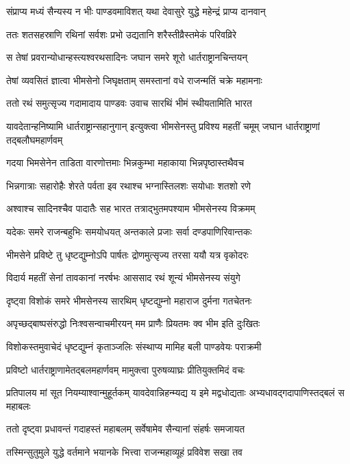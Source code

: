 \threelineshloka
{संप्राप्य मध्यं सैन्यस्य न भीः पाण्डवमाविशत्}
{यथा देवासुरे युद्धे महेन्द्रं प्राप्य दानवान्}
{}


\twolineshloka
{ततः शतसहस्राणि रथिनां सर्वशः प्रभो}
{उद्यतानि शरैस्तीव्रैस्तमेकं परिवव्रिरे}


\twolineshloka
{स तेषां प्रवरान्योधान्हस्त्यश्वरथसादिनः}
{जघान समरे शूरो धार्तराष्ट्रानचिन्तयन्}


\twolineshloka
{तेषां व्यवसितं ज्ञात्वा भीमसेनो जिघृक्षताम्}
{समस्तानां वधे राजन्मतिं चक्रे महामनाः}


\twolineshloka
{ततो रथं समुत्सृज्य गदामादाय पाण्डवः}
{उवाच सारथिं भीमं स्थीयतामिति भारत}


\threelineshloka
{यावदेतान्हनिष्यामि धार्तराष्ट्रान्सहानुगान्}
{इत्युक्त्वा भीमसेनस्तु प्रविश्य महतीं चमूम्}
{जघान धार्तराष्ट्राणां तद्बलौघमहार्णवम्}


\twolineshloka
{गदया भिमसेनेन ताडिता वारणोत्तमाः}
{भिन्नकुम्भा महाकाया भिन्नपृष्ठास्तथैवच}


\twolineshloka
{भिन्नगात्राः सहारोहैः शेरते पर्वता इव}
{रथाश्च भग्नास्तिलशः सयोधाः शतशो रणे}


\twolineshloka
{अश्वाश्च सादिनश्चैव पादातैः सह भारत}
{तत्राद्भुतमपश्याम भीमसेनस्य विक्रमम्}


\twolineshloka
{यदेकः समरे राजन्बहुभिः समयोधयत्}
{अन्तकाले प्रजाः सर्वा दण्डपाणिरिवान्तकः}


\twolineshloka
{भीमसेने प्रविष्टे तु धृष्टद्युम्नोऽपि पार्षतः}
{द्रोणमुत्सृज्य तरसा ययौ यत्र वृकोदरः}


\twolineshloka
{विदार्य महतीं सेनां तावकानां नरर्षभः}
{आससाद रथं शून्यं भीमसेनस्य संयुगे}


\twolineshloka
{दृष्ट्वा विशोकं समरे भीमसेनस्य सारथिम्}
{धृष्टद्युम्नो महाराज दुर्मना गतचेतनः}


\twolineshloka
{अपृच्छद्बाष्पसंरुद्धो निःश्वसन्वाचमीरयन्}
{मम प्राणैः प्रियतमः क्व भीम इति दुःखितः}


\twolineshloka
{विशोकस्तमुवाचेदं धृष्टद्युम्नं कृताञ्जलिः}
{संस्थाप्य मामिह बली पाण्डवेयः पराक्रमी}


\twolineshloka
{प्रविष्टो धार्तराष्ट्राणामेतद्बलमहार्णवम्}
{मामुक्त्वा पुरुषव्याघ्रः प्रीतियुक्तमिदं वचः}


\threelineshloka
{प्रतिपालय मां सूत नियम्याश्वान्मुहूर्तकम्}
{यावदेवान्निहन्म्यद्य य इमे मद्वधोद्यताः}
{अभ्यधावद्गदापाणिस्तद्बलं स महाबलः}


\twolineshloka
{ततो दृष्ट्वा प्रधावन्तं गदाहस्तं महाबलम्}
{सर्वेषामेव सैन्यानां संहर्षः समजायत}


\twolineshloka
{तस्मिन्सुतुमुले युद्धे वर्तमाने भयानके}
{भित्त्वा राजन्महाव्यूहं प्रविवेश सखा तव}


